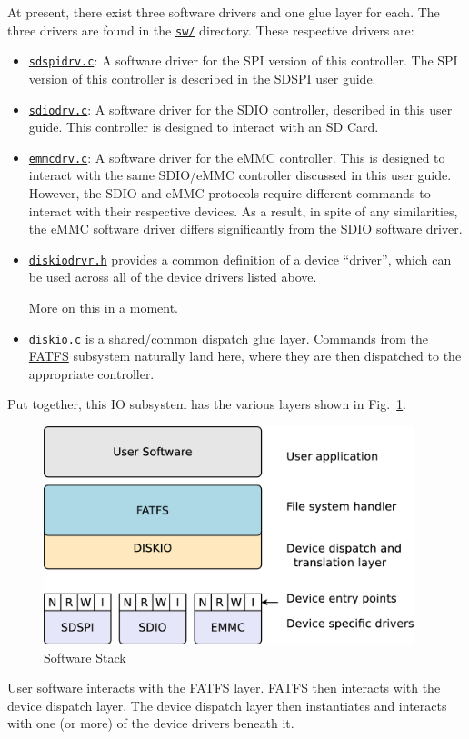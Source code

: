 \documentclass{gqtekspec}
\newcommand{\zhref}[2]{\href{#1}{\textcolor{dkblue}{#2}}}
\begin{document}
At present, there exist three software drivers and one glue layer for each.
The three drivers are found in the \zhref{../sw/}{\tt sw/} directory.  These
respective drivers are:
\begin{itemize}
\item \zhref{../sw/sdspidrv.c}{\tt sdspidrv.c}: A software driver for the SPI
	version of this controller.  The SPI version of this controller is
	described in the SDSPI user guide.
\item \zhref{../sw/sdiodrv.c}{\tt sdiodrv.c}: A software driver for the SDIO
	controller, described in this user guide.  This controller is designed
	to interact with an SD Card.
\item \zhref{../sw/emmcdrv.c}{\tt emmcdrv.c}: A software driver for the eMMC
	controller.  This is designed to interact with the same SDIO/eMMC
	controller discussed in this user guide.  However, the SDIO and eMMC
	protocols require different commands to interact with their respective
	devices.  As a result, in spite of any similarities, the eMMC software
	driver differs significantly from the SDIO software driver.
\item \zhref{../sw/diskiodrvr.c}{\tt diskiodrvr.h} provides a common definition
	of a device ``driver'', which can be used across all of the device
	drivers listed above.

	More on this in a moment.
\item \zhref{../sw/diskio.c}{\tt diskio.c} is a shared/common dispatch glue
	layer.  Commands from the \zhref{http://elm-chan.org/fsw/ff/}{FATFS}
	subsystem naturally land here, where they are then dispatched to the
	appropriate controller.
\end{itemize}

Put together, this IO subsystem has the various layers shown in
Fig.~\ref{fig:swlayers}.
\begin{figure}\begin{center}
\includegraphics[height=2.5in]{gfx/swlayers.eps}
\caption{Software Stack}\label{fig:swlayers}
\end{center}\end{figure}
User software interacts with the \zhref{http://elm-chan.org/fsw/ff/}{FATFS}
layer.  \zhref{http://elm-chan.org/fsw/ff/}{FATFS} then interacts with the
device dispatch layer.  The device dispatch layer then instantiates and
interacts with one (or more) of the device drivers beneath it.
\end{document}
